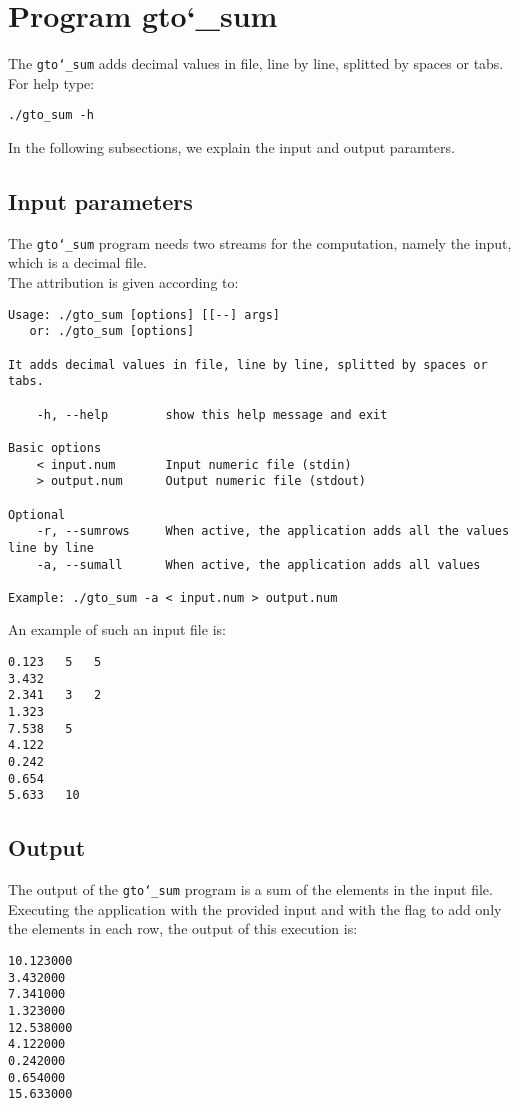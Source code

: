 \section{Program gto\char`_sum}
The \texttt{gto\char`_sum} adds decimal values in file, line by line, splitted by spaces or tabs.\\
For help type:
\begin{lstlisting}
./gto_sum -h
\end{lstlisting}
In the following subsections, we explain the input and output paramters.

\subsection*{Input parameters}

The \texttt{gto\char`_sum} program needs two streams for the computation, namely the input, which is a decimal file.\\
The attribution is given according to:
\begin{lstlisting}
Usage: ./gto_sum [options] [[--] args]
   or: ./gto_sum [options]

It adds decimal values in file, line by line, splitted by spaces or tabs.

    -h, --help        show this help message and exit

Basic options
    < input.num       Input numeric file (stdin)
    > output.num      Output numeric file (stdout)

Optional
    -r, --sumrows     When active, the application adds all the values line by line
    -a, --sumall      When active, the application adds all values

Example: ./gto_sum -a < input.num > output.num
\end{lstlisting}
An example of such an input file is:
\begin{lstlisting}
0.123	5	5
3.432
2.341   3   2
1.323
7.538	5
4.122
0.242 
0.654
5.633	10
\end{lstlisting}

\subsection*{Output}
The output of the \texttt{gto\char`_sum} program is a sum of the elements in the input file.\\
Executing the application with the provided input and with the flag to add only the elements in each row, the output of this execution is:
\begin{lstlisting}
10.123000
3.432000
7.341000
1.323000
12.538000
4.122000
0.242000
0.654000
15.633000
\end{lstlisting}